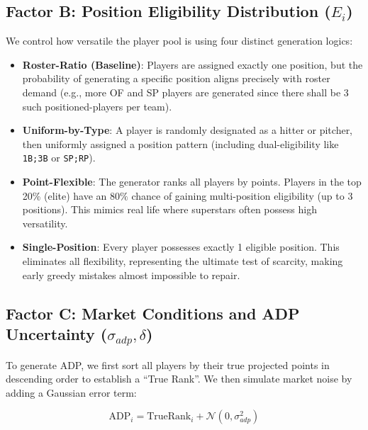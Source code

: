 \documentclass[11pt,a4paper]{article}
\begin{document}
\subsection{Factor B: Position Eligibility Distribution (\texorpdfstring{$E_i$}{Ei})}
We control how versatile the player pool is using four distinct generation logics:
\begin{itemize}[leftmargin=1.5em]
    \item \textbf{Roster-Ratio (Baseline)}: Players are assigned exactly one position, but the probability of generating a specific position aligns precisely with roster demand (e.g., more OF and SP players are generated since there shall be 3 such positioned-players per team).
    \item \textbf{Uniform-by-Type}: A player is randomly designated as a hitter or pitcher, then uniformly assigned a position pattern (including dual-eligibility like \texttt{1B;3B} or \texttt{SP;RP}).
    \item \textbf{Point-Flexible}: The generator ranks all players by points. Players in the top 20\% (elite) have an $80\%$ chance of gaining multi-position eligibility (up to 3 positions). This mimics real life where superstars often possess high versatility.
    \item \textbf{Single-Position}: Every player possesses exactly 1 eligible position. This eliminates all flexibility, representing the ultimate test of scarcity, making early greedy mistakes almost impossible to repair.
\end{itemize}

\subsection{Factor C: Market Conditions and ADP Uncertainty ($\sigma_{adp}, \delta$)}

To generate ADP, we first sort all players by their true projected points in descending order to establish a ``True Rank''. We then simulate market noise by adding a Gaussian error term:

\begin{equation}
    \text{ADP}_i = \text{TrueRank}_i + \mathcal{N}(0, \sigma_{adp}^2)
\end{equation}
\end{document}
